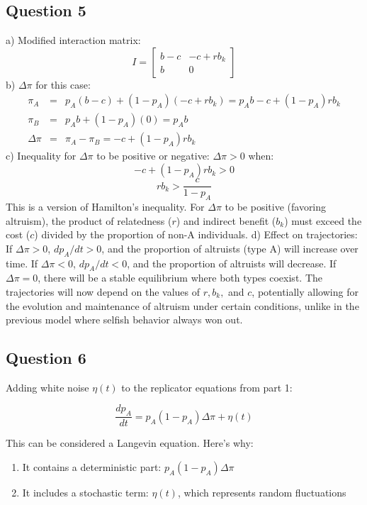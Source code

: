 \documentclass{article}
\begin{document}
\subsection{Question 5}
a) Modified interaction matrix:
\[
I = \begin{bmatrix} b-c & -c+rb_k \\ b & 0 \end{bmatrix}
\]
b) \(\Delta\pi\) for this case:
\[
\begin{array}{rcl}
\pi_A & = & p_A(b-c) + (1-p_A)(-c+rb_k) = p_A b - c + (1-p_A)rb_k \\
\pi_B & = & p_A b + (1-p_A)(0) = p_A b \\
\Delta\pi & = & \pi_A - \pi_B = -c + (1-p_A)rb_k
\end{array}
\]
c) Inequality for \(\Delta\pi\) to be positive or negative:
\(\Delta\pi > 0\) when:
\[
-c + (1-p_A)rb_k > 0
\]
\[
rb_k > \frac{c}{1-p_A}
\]
This is a version of Hamilton's inequality. For \(\Delta\pi\) to be positive (favoring altruism), the product of relatedness (\(r\)) and indirect benefit (\(b_k\)) must exceed the cost (\(c\)) divided by the proportion of non-A individuals.
d) Effect on trajectories:
If \(\Delta\pi > 0\), \(dp_A/dt > 0\), and the proportion of altruists (type A) will increase over time.
If \(\Delta\pi < 0\), \(dp_A/dt < 0\), and the proportion of altruists will decrease.
If \(\Delta\pi = 0\), there will be a stable equilibrium where both types coexist.
The trajectories will now depend on the values of \(r, b_k,\) and \(c\), potentially allowing for the evolution and maintenance of altruism under certain conditions, unlike in the previous model where selfish behavior always won out.


\subsection{Question 6}

Adding white noise \(\eta(t)\) to the replicator equations from part 1:

\[
\frac{dp_A}{dt} = p_A(1-p_A)\Delta\pi + \eta(t)
\]

This can be considered a Langevin equation. Here's why:

\begin{enumerate}
\item It contains a deterministic part: \(p_A(1-p_A)\Delta\pi\)
\item It includes a stochastic term: \(\eta(t)\), which represents random fluctuations
\end{enumerate}
\end{document}
